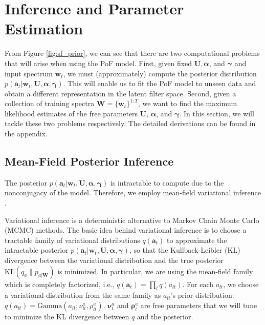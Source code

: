 \documentclass{article} %
\begin{document}
\section{Inference and Parameter Estimation}
\label{sec:inference}
From Figure \ref{fig:sf_prior}, we can see that there are two computational problems that will arise when using the PoF model. First, given fixed $\mathbf{U}, \bm{\alpha}$, and $\bm{\gamma}$ and input spectrum $\bm{w}_t$, we must (approximately) compute the posterior distribution $p(\bm{a}_t | \bm{w}_t, \mathbf{U}, \bm{\alpha}, \bm{\gamma})$. This will enable us to fit the PoF model to unseen data and obtain a different representation in the latent filter space. Second, given a collection of training spectra $\mathbf{W} = \{\bm{w}_t\}^{1:T}$, we want to find the maximum likelihood estimates of the free parameters $\mathbf{U}$, $\bm{\alpha}$, and $\bm{\gamma}$. In this section, we will tackle these two problems respectively. The detailed derivations can be found in the appendix.  

\subsection{Mean-Field Posterior Inference}\label{sec:e-step}
The posterior $p(\bm{a}_t | \bm{w}_t, \mathbf{U}, \bm{\alpha}, \bm{\gamma})$ is intractable to compute due to the nonconjugacy of the model. Therefore, we employ mean-field variational inference \cite{jordan1999introduction}.

Variational inference is a deterministic alternative to Markov Chain Monte Carlo (MCMC) methods.  The basic idea behind variational
inference is to choose a tractable family of variational distributions
$q(\bm{a}_t)$ to approximate the intractable posterior $p(\bm{a}_t |
\bm{w}_t, \mathbf{U}, \bm{\alpha}, \bm{\gamma})$, so that the
Kullback-Leibler (KL) divergence between the variational distribution and
the true posterior $\text{KL}(q_a \| p_{a|\mathbf{W}})$ is
minimized. In particular, we are using the mean-field family which is
completely factorized, i.e., $q(\bm{a}_t) = \prod_l q(a_{lt})$. For
each $a_{lt}$, we choose a variational distribution from
the same family as $a_{lt}$'s prior distribution: $q(a_{lt}) =
\text{Gamma}(a_{lt}; \nu_{lt}^a, \rho_{lt}^a)$. $\bm{\nu}^a_t$ and
$\bm{\rho}^a_t$ are free parameters that we will tune to minimize the
KL divergence between $q$ and the posterior.
\end{document}
